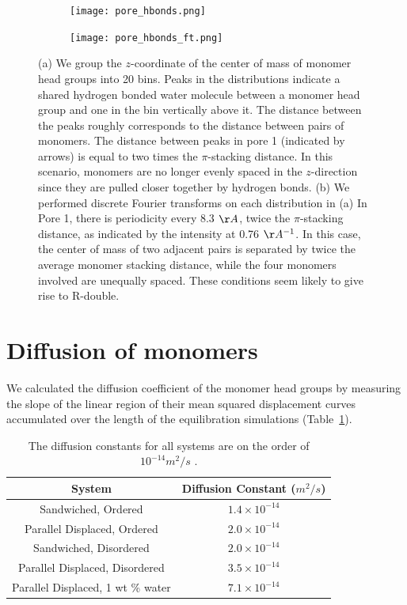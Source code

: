 \documentclass{article}
\begin{document}
  \begin{figure}[!htb]
  \centering
  \begin{subfigure}{0.45\textwidth}
  \texttt{[image: pore\_hbonds.png]}
  \caption{}\label{fig:pore_hbonds}
  \end{subfigure}
  \begin{subfigure}{0.45\textwidth}
  \texttt{[image: pore\_hbonds\_ft.png]}
  \caption{}\label{fig:pore_hbonds_ft}
  \end{subfigure}
  \caption{(a) We group the $z$-coordinate of the center of mass of monomer
  head groups into 20 bins. Peaks in the distributions indicate a shared hydrogen bonded
  water molecule between a monomer head group and one in the bin vertically above it. 
  The distance between the peaks roughly corresponds to the distance between pairs of 
  monomers. The distance between peaks in pore 1 (indicated by arrows) is equal to two 
  times the $\pi$-stacking distance. In this scenario, monomers are no longer evenly spaced
  in the $z$-direction since they are pulled closer together by hydrogen bonds. (b) We 
  performed discrete Fourier transforms on each distribution in (a) In Pore 1, there 
  is periodicity every 8.3 $\AA$, twice the $\pi$-stacking distance, as indicated by the
  intensity at 0.76 $\AA^{-1}$. In this case, the center of mass of two adjacent pairs 
  is separated by twice the average monomer stacking distance, while the four monomers 
  involved are unequally spaced. These conditions seem likely to give rise to R-double.
  }\label{fig:hbonds}
  \end{figure}
  
  \section{Diffusion of monomers}

  We calculated the diffusion coefficient of the monomer head groups by measuring
  the slope of the linear region of their mean squared displacement curves accumulated
  over the length of the equilibration simulations (Table~\ref{table:msd}). 
  
  \begin{table}[h]
  \centering
  \begin{tabular}{cc}
  \toprule
  System & Diffusion Constant ($m^2/s$) \\ 
  \midrule
  Sandwiched, Ordered & $1.4 \times 10^{-14}$ \\
  Parallel Displaced, Ordered & $2.0 \times 10^{-14}$ \\
  Sandwiched, Disordered & $2.0 \times 10^{-14}$ \\
  Parallel Displaced, Disordered & $3.5 \times 10^{-14}$ \\
  Parallel Displaced, 1 wt \% water & $7.1 \times 10^{-14}$ \\
  \bottomrule
  \end{tabular}
  \caption{The diffusion constants for all systems are on the order of $10^{-14} m^2/s$ 
  .}~\label{table:msd}
  \end{table}
  
\end{document}
